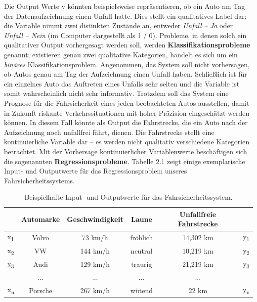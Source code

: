 Die Output Werte y könnten beispielsweise repräsentieren, ob ein
Auto am Tag der Datenaufzeichnung einen Unfall hatte. Dies stellt ein qualitatives
Label dar: die Variable nimmt zwei distinkten Zustände an, entweder \emph{Unfall --
  Ja} oder \emph{Unfall -- Nein} (im Computer dargestellt als 1 / 0). Probleme, in
denen solch ein qualitativer Output vorhergesagt werden soll, werden
\textbf{Klassifikationsprobleme} genannt; existieren genau zwei qualitative
Kategorien, handelt es sich um ein \emph{binäres} Klassifikationsproblem. Angenommen,
das System soll nicht vorhersagen, ob Autos genau am Tag der Aufzeichnung einen
Unfall haben. Schließlich ist für ein einzelnes Auto das Auftreten eines Unfalls sehr
selten und die Variable ist somit wahrscheinlich nicht sehr informativ. Trotzdem soll
das System eine Prognose für die Fahrsicherheit eines jeden beobachteten Autos
ausstellen, damit in Zukunft riskante Verkehrssituationen mit hoher Präzision
eingeschätzt werden können. In diesem Fall könnte als Output die Fahrstrecke, die ein
Auto nach der Aufzeichnung noch unfallfrei fährt, dienen. Die Fahrstrecke stellt eine
kontinuierliche Variable dar -- es werden nicht qualitativ verschiedene Kategorien
betrachtet. Mit der Vorhersage kontinuierlicher Variablenwerte beschäftigen sich die
sogenannten \textbf{Regressionsprobleme}. Tabelle 2.1 zeigt einige exemplarische
Input- und Outputwerte für das Regressionsproblem unseres Fahrsicherheitssystems.

\begin{table}[h!]
  \centering
  \caption{Beispielhafte Input- und Outputwerte für das Fahrsicherheitssystem.}

\vspace{0.3cm}

  \label{tab:svm_table1}
  \def\arraystretch{1.5}%
  \begin{tabular}{l|c|c|c||c|c}
    & Automarke & Geschwindigkeit & Laune & Unfallfreie Fahrstrecke &\\
    \hline
    x\textsubscript{1} & Volvo & 73 km/h & fröhlich & 14,302 km & y\textsubscript{1}\\
    \hline
    x\textsubscript{2} & VW & 144 km/h & neutral & 10,219 km & y\textsubscript{2}\\
    \hline
    x\textsubscript{3} & Audi & 129 km/h & traurig & 21,219 km & y\textsubscript{3}\\
    \hline

    & ... & ... & ... & ... &\\
    \hline
    x\textsubscript{n} & Porsche & 267 km/h & wütend & 22 km & y\textsubscript{n} \\

  \end{tabular}
\end{table}

